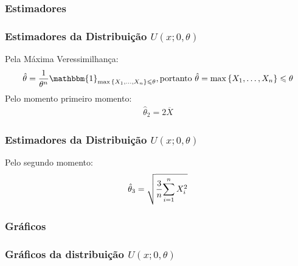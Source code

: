 \subsubsection{Estimadores}
\begin{frame}
\frametitle{Estimadores da Distribuição $U(x; 0,\theta)$}
Pela Máxima Veressimilhança:
\small \begin{equation}
\label{eq:U_MV}
\hat{\theta}={\dfrac{1}{\theta ^ n }}{ \mathbbm{1}_{\max{\{X_1,\dots,X_n\}\leqslant\theta}}},
\textnormal{portanto } \hat{\theta} = {\max{\{X_1,\dots,X_n\}\leqslant\theta}} 
\end{equation} \pause
Pelo momento primeiro momento:
\begin{eqnarray}
\label{eq:U_m_p2}
\hat{\theta}_{2}=2\overline{X}
\end{eqnarray}
\end{frame}

\begin{frame}
\frametitle{Estimadores da Distribuição $U(x; 0,\theta)$}
Pelo segundo momento:
\begin{equation}
\label{eq:U_m_p3}
\hat{\theta}_{3} = \sqrt{{{{3} \over {n}} {\sum_{i=1}^{n} X_{i}^{2}}}}
\end{equation}

\end{frame}


\subsubsection{Gráficos}
\begin{frame}
\frametitle{Gráficos da distribuição $U(x; 0,\theta)$}

\end{frame}



